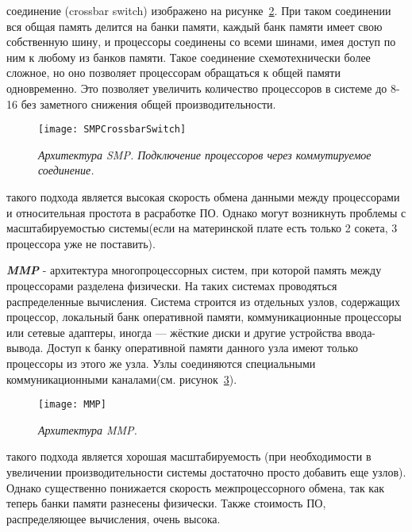 {\begin{itemize}
\begin{figure}[H]
					\label{SMPSystemBus:image}
				\end{figure}
			 соединение (crossbar switch) изображено на рисунке~\ref{SMPCrossbarSwitch:image}. При таком соединении вся общая память делится на банки памяти, каждый банк памяти имеет свою собственную шину, и процессоры соединены со всеми шинами, имея доступ по ним к любому из банков памяти. Такое соединение схемотехнически более сложное, но оно позволяет процессорам обращаться к общей памяти одновременно. Это позволяет увеличить количество процессоров в системе до 8-16 без заметного снижения общей производительности.
				\begin{figure}[H]
					\texttt{[image: SMPCrossbarSwitch]}
					\caption{\textit{Архитектура SMP. Подключение процессоров через коммутируемое соединение.}}
					\label{SMPCrossbarSwitch:image}
				\end{figure}
		\end{itemize}
	 такого подхода является высокая скорость обмена данными между процессорами и относительная простота в расработке ПО. Однако могут возникнуть проблемы с масштабируемостью системы(если на материнской плате есть только 2 сокета, 3 процессора уже не поставить).
	\par\textbf{\textit{MMP}} - архитектура многопроцессорных систем, при которой память между процессорами разделена физически. На таких системах проводяться распределенные вычисления. Система строится из отдельных узлов, содержащих процессор, локальный банк оперативной памяти, коммуникационные процессоры или сетевые адаптеры, иногда — жёсткие диски и другие устройства ввода-вывода. Доступ к банку оперативной памяти данного узла имеют только процессоры из этого же узла. Узлы соединяются специальными коммуникационными каналами(см. рисунок~\ref{MMP:image}).
		\begin{figure}[H]
			\texttt{[image: MMP]}
			\caption{\textit{Архитектура MMP.}}
			\label{MMP:image}
		\end{figure}
	 такого подхода является хорошая масштабируемость (при необходимости в увеличении производительности системы достаточно просто добавить еще узлов). Однако существенно понижается скорость межпроцессорного обмена, так как теперь банки памяти разнесены физически. Также стоимость ПО, распределяющее вычисления, очень высока.
	\par
}